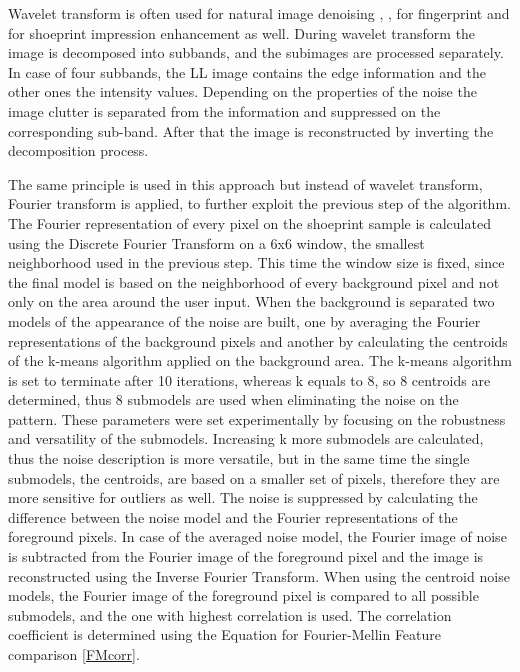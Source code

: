 \documentclass[draft,final]{vutinfth} %
\begin{document}
Wavelet transform is often used for natural image denoising \cite{xu2016image}, \cite{sugamya2016image}, for fingerprint \cite{li2012texture} and for shoeprint impression enhancement \cite{katireddy2017novel} as well.
During wavelet transform the image is decomposed into subbands, and the subimages are processed separately.
In case of four subbands, the LL image contains the edge information and the other ones the intensity values.
Depending on the properties of the noise the image clutter is separated from the information and suppressed on the corresponding sub-band.
After that the image is reconstructed by inverting the decomposition process.
\par
The same principle is used in this approach but instead of wavelet transform, Fourier transform is applied, to further exploit the previous step of the algorithm.
The Fourier representation of every pixel on the shoeprint sample is calculated using the Discrete Fourier Transform on a 6x6 window, the smallest neighborhood used in the previous step.
This time the window size is fixed, since the final model is based on the neighborhood of every background pixel and not only on the area around the user input.
When the background is separated two models of the appearance of the noise are built, one by averaging the Fourier representations of the background pixels and another by calculating the centroids of the k-means algorithm applied on the background area.
The k-means algorithm is set to terminate after 10 iterations, whereas k equals to 8, so 8 centroids are determined, thus 8 submodels are used when eliminating the noise on the pattern.
These parameters were set experimentally by focusing on the robustness and versatility of the submodels.
Increasing k more submodels are calculated, thus the noise description is more versatile, but in the same time the single submodels, the centroids, are based on a smaller set of pixels, therefore they are more sensitive for outliers as well. 
The noise is suppressed by calculating the difference between the noise model and the Fourier representations of the foreground pixels.
In case of the averaged noise model, the Fourier image of noise is subtracted from the Fourier image of the foreground pixel and the image is reconstructed using the Inverse Fourier Transform.
When using the centroid noise models, the Fourier image of the foreground pixel is compared to all possible submodels, and the one with highest correlation is used.
The correlation coefficient is determined using the Equation for Fourier-Mellin Feature comparison \ref{FMcorr}.
\end{document}
